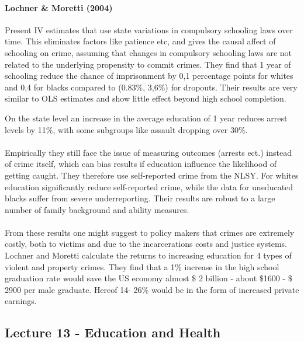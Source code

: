 \documentclass[12pt, a4paper]{article}
\begin{document}
\begin{multicols}{2}
\paragraph{Lochner \& Moretti (2004)} Present IV estimates that use state variations in compulsory schooling laws over time. This eliminates factors like patience etc, and gives the causal affect of schooling on crime, assuming that changes in compulsory schooling laws are not related to the underlying propensity to commit crimes. They find that 1 year of schooling reduce the chance of imprisonment by 0,1 percentage points for whites and 0,4 for blacks compared to (0.83\%, 3,6\%) for dropouts. Their results are very similar to OLS estimates and show little effect beyond high school completion. 

On the state level an increase in the average education of 1 year reduces arrest levels by 11\%, with some subgroups like assault dropping over 30\%.
\\ \\
Empirically they still face the issue of measuring outcomes (arrests ect.) instead of crime itself, which can bias results if education influence the likelihood of getting caught. They therefore use self-reported crime from the NLSY. For whites education significantly reduce self-reported crime, while the data for uneducated blacks suffer from severe underreporting. Their results are robust to a large number of family background and ability measures.
\\ \\
From these results one might suggest to policy makers that crimes are extremely costly, both to victims and due to the incarcerations costs and justice systems. Lochner and Moretti calculate the returns to increasing education for 4 types of violent and property crimes. They find that a 1\% increase in the high school graduation rate would save the US economy almost \$ 2 billion - about \$1600 - \$ 2900 per male graduate. Hereof 14- 26\% would be in the form of increased private earnings.  


\subsection{Lecture 13 - Education and Health}

\end{multicols}
\end{document}
